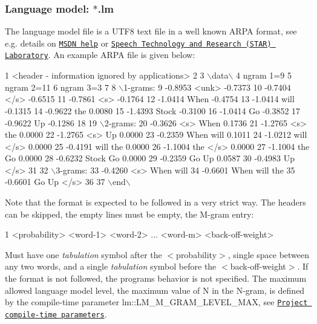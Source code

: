 \subsubsection*{Language model\+: {\ttfamily $\ast$.lm}}

The language model file is a U\+T\+F8 text file in a well known A\+R\+P\+A format, see e.\+g. details on \href{https://msdn.microsoft.com/en-us/library/office/hh378460%28v=office.14%29.aspx}{\tt M\+S\+D\+N help} or \href{http://www.speech.sri.com/projects/srilm/manpages/ngram-format.5.html}{\tt Speech Technology and Research (S\+T\+A\+R) Laboratory}. An example A\+R\+P\+A file is given below\+:


\begin{DoxyCode}
1 <header - information ignored by applications>
2 
3 \(\backslash\)data\(\backslash\)
4 ngram 1=9
5 ngram 2=11
6 ngram 3=3
7 
8 \(\backslash\)1-grams:
9 -0.8953 <unk>        -0.7373
10 -0.7404 </s> -0.6515
11 -0.7861 <s>   -0.1764
12 -1.0414 When -0.4754
13 -1.0414 will -0.1315
14 -0.9622 the   0.0080
15 -1.4393 Stock        -0.3100
16 -1.0414 Go    -0.3852
17 -0.9622 Up    -0.1286
18 
19 \(\backslash\)2-grams:
20 -0.3626 <s> When     0.1736
21 -1.2765 <s> the      0.0000
22 -1.2765 <s> Up       0.0000
23 -0.2359 When will    0.1011
24 -1.0212 will </s>    0.0000
25 -0.4191 will the     0.0000
26 -1.1004 the </s>     0.0000
27 -1.1004 the Go       0.0000
28 -0.6232 Stock Go     0.0000
29 -0.2359 Go Up        0.0587
30 -0.4983 Up </s>      
31 
32 \(\backslash\)3-grams:
33 -0.4260 <s> When will      
34 -0.6601 When will the      
35 -0.6601 Go Up </s>   
36 
37 \(\backslash\)end\(\backslash\)
\end{DoxyCode}
 Note that the format is expected to be followed in a very strict way. The headers can be skipped, the empty lines must be empty, the M-\/gram entry\+:


\begin{DoxyCode}
1 <probability>    <word-1> <word-2> ... <word-m>    <back-off-weight>
\end{DoxyCode}
 Must have one {\itshape tabulation} symbol after the {\ttfamily $<$probability$>$}, single space between any two words, and a single {\itshape tabulation} symbol before the {\ttfamily $<$back-\/off-\/weight$>$}. If the format is not followed, the program\textquotesingle{}s behavior is not specified. The maximum allowed language model level, the maximum value of N in the N-\/gram, is defined by the compile-\/time parameter {\ttfamily lm\+::\+L\+M\+\_\+\+M\+\_\+\+G\+R\+A\+M\+\_\+\+L\+E\+V\+E\+L\+\_\+\+M\+A\+X}, see \href{#project-compile-time-parameters}{\tt Project compile-\/time parameters}.


